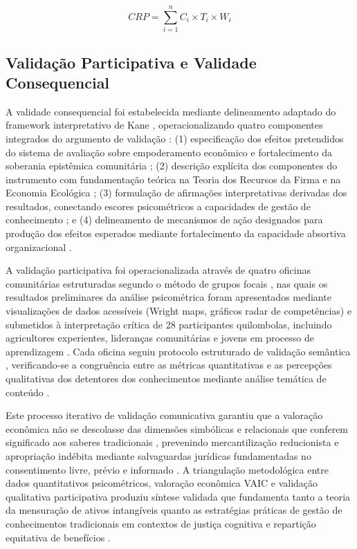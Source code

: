 \begin{equation}
CRP = \sum_{i=1}^{n} C_i \times T_i \times W_i
\end{equation}

\subsection{Validação Participativa e Validade Consequencial}

A validade consequencial foi estabelecida mediante delineamento adaptado do framework interpretativo de Kane \cite{Kane2013}, operacionalizando quatro componentes integrados do argumento de validação \cite{Kane2006}: (1) especificação dos efeitos pretendidos do sistema de avaliação sobre empoderamento econômico e fortalecimento da soberania epistêmica comunitária \cite{Messick1995}; (2) descrição explícita dos componentes do instrumento com fundamentação teórica na Teoria dos Recursos da Firma \cite{Barney1991} e na Economia Ecológica \cite{Costanza1997}; (3) formulação de afirmações interpretativas derivadas dos resultados, conectando escores psicométricos a capacidades de gestão de conhecimento \cite{Shavelson2009}; e (4) delineamento de mecanismos de ação designados para produção dos efeitos esperados mediante fortalecimento da capacidade absortiva organizacional \cite{CohenLevinthal1990}.

A validação participativa foi operacionalizada através de quatro oficinas comunitárias estruturadas segundo o método de grupos focais \cite{Krueger2014}, nas quais os resultados preliminares da análise psicométrica foram apresentados mediante visualizações de dados acessíveis (Wright maps, gráficos radar de competências) e submetidos à interpretação crítica de 28 participantes quilombolas, incluindo agricultores experientes, lideranças comunitárias e jovens em processo de aprendizagem \cite{FalsBorda1991}. Cada oficina seguiu protocolo estruturado de validação semântica \cite{Pasquali2010}, verificando-se a congruência entre as métricas quantitativas e as percepções qualitativas dos detentores dos conhecimentos mediante análise temática de conteúdo \cite{Braun2006}.

Este processo iterativo de validação comunicativa \cite{Habermas1984} garantiu que a valoração econômica não se descolasse das dimensões simbólicas e relacionais que conferem significado aos saberes tradicionais \cite{Agrawal2002}, prevenindo mercantilização reducionista \cite{Polanyi1944} e apropriação indébita mediante salvaguardas jurídicas fundamentadas no consentimento livre, prévio e informado \cite{Wynberg2015}. A triangulação metodológica \cite{Denzin1978} entre dados quantitativos psicométricos, valoração econômica VAIC e validação qualitativa participativa produziu síntese validada que fundamenta tanto a teoria da mensuração de ativos intangíveis \cite{Lev2001} quanto as estratégias práticas de gestão de conhecimentos tradicionais em contextos de justiça cognitiva \cite{Santos2007} e repartição equitativa de benefícios \cite{Schroeder2020}.







